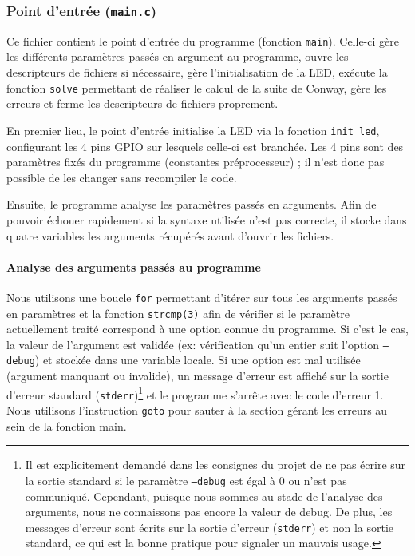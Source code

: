 \documentclass[a4paper,11pt]{article}
\begin{document}
\subsubsection{Point d'entrée (\texttt{main.c})}

Ce fichier contient le point d'entrée du programme (fonction \texttt{main}). Celle-ci gère les différents paramètres passés en argument au programme, ouvre les descripteurs de fichiers si nécessaire, gère l'initialisation de la LED, exécute la fonction \texttt{solve} permettant de réaliser le calcul de la suite de Conway, gère les erreurs et ferme les descripteurs de fichiers proprement.

En premier lieu, le point d'entrée initialise la LED via la fonction \texttt{init\_led}, configurant les 4 pins GPIO sur lesquels celle-ci est branchée. Les 4 pins sont des paramètres fixés du programme (constantes préprocesseur) ; il n'est donc pas possible de les changer sans recompiler le code.

Ensuite, le programme analyse les paramètres passés en arguments. Afin de pouvoir échouer rapidement si la syntaxe utilisée n'est pas correcte, il stocke dans quatre variables les arguments récupérés avant d'ouvrir les fichiers.

\paragraph*{Analyse des arguments passés au programme}

Nous utilisons une boucle \texttt{for} permettant d'itérer sur tous les arguments passés en paramètres et la fonction \texttt{strcmp(3)} afin de vérifier si le paramètre actuellement traité correspond à une option connue du programme. Si c'est le cas, la valeur de l'argument est validée (ex: vérification qu'un entier suit l'option \texttt{--debug}) et stockée dans une variable locale. Si une option est mal utilisée (argument manquant ou invalide), un message d'erreur est affiché sur la sortie d'erreur standard (\texttt{stderr})\footnote{Il est explicitement demandé dans les consignes du projet de ne pas écrire sur la sortie standard si le paramètre \texttt{--debug} est égal à 0 ou n'est pas communiqué. Cependant, puisque nous sommes au stade de l'analyse des arguments, nous ne connaissons pas encore la valeur de debug. De plus, les messages d'erreur sont écrits sur la sortie d'erreur (\texttt{stderr}) et non la sortie standard, ce qui est la bonne pratique pour signaler un mauvais usage.} et le programme s'arrête avec le code d'erreur 1. Nous utilisons l'instruction \texttt{goto} pour sauter à la section gérant les erreurs au sein de la fonction main.
\end{document}
